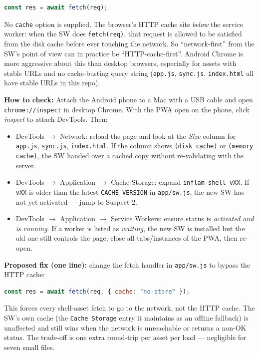\documentclass[11pt,a4paper]{article}
\begin{document}
\begin{lstlisting}[language=js]
const res = await fetch(req);
\end{lstlisting}

No \texttt{cache} option is supplied. The browser's HTTP cache sits \emph{below} the service worker: when the SW does \texttt{fetch(req)}, that request is allowed to be satisfied from the disk cache before ever touching the network. So ``network-first'' from the SW's point of view can in practice be ``HTTP-cache-first''. Android Chrome is more aggressive about this than desktop browsers, especially for assets with stable URLs and no cache-busting query string (\texttt{app.js}, \texttt{sync.js}, \texttt{index.html} all have stable URLs in this repo).

\textbf{How to check:} Attach the Android phone to a Mac with a USB cable and open \texttt{chrome://inspect} in desktop Chrome. With the PWA open on the phone, click \emph{inspect} to attach DevTools. Then:
\begin{itemize}[leftmargin=1.6em]
  \item DevTools $\to$ Network: reload the page and look at the \emph{Size} column for \texttt{app.js}, \texttt{sync.js}, \texttt{index.html}. If the column shows \texttt{(disk cache)} or \texttt{(memory cache)}, the SW handed over a cached copy without re-validating with the server.
  \item DevTools $\to$ Application $\to$ Cache Storage: expand \texttt{inflam-shell-vXX}. If \texttt{vXX} is older than the latest \texttt{CACHE\_VERSION} in \texttt{app/sw.js}, the new SW has not yet activated --- jump to Suspect 2.
  \item DevTools $\to$ Application $\to$ Service Workers: ensure status is \emph{activated and is running}. If a worker is listed as \emph{waiting}, the new SW is installed but the old one still controls the page; close all tabs/instances of the PWA, then re-open.
\end{itemize}

\textbf{Proposed fix (one line):} change the fetch handler in \texttt{app/sw.js} to bypass the HTTP cache:

\begin{lstlisting}[language=js]
const res = await fetch(req, { cache: "no-store" });
\end{lstlisting}

This forces every shell-asset fetch to go to the network, not the HTTP cache. The SW's own cache (the \texttt{Cache Storage} entry it maintains as an offline fallback) is unaffected and still wins when the network is unreachable or returns a non-OK status. The trade-off is one extra round-trip per asset per load --- negligible for seven small files.
\end{document}
